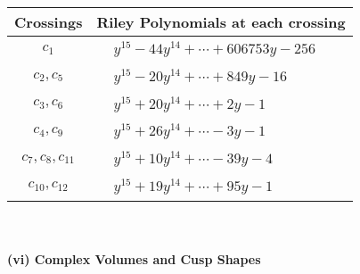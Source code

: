 \documentclass[1p]{elsarticle_modified}
\theoremstyle{definition}
\begin{document}
\begin{tabular}{m{50pt}|m{274pt}}
Crossings & \hspace{64pt}Riley Polynomials at each crossing \\
\hline $$\begin{aligned}c_{1}\end{aligned}$$&$\begin{aligned}
&y^{15}-44 y^{14}+\cdots+606753 y-256
\end{aligned}$\\
\hline $$\begin{aligned}c_{2},c_{5}\end{aligned}$$&$\begin{aligned}
&y^{15}-20 y^{14}+\cdots+849 y-16
\end{aligned}$\\
\hline $$\begin{aligned}c_{3},c_{6}\end{aligned}$$&$\begin{aligned}
&y^{15}+20 y^{14}+\cdots+2 y-1
\end{aligned}$\\
\hline $$\begin{aligned}c_{4},c_{9}\end{aligned}$$&$\begin{aligned}
&y^{15}+26 y^{14}+\cdots-3 y-1
\end{aligned}$\\
\hline $$\begin{aligned}c_{7},c_{8},c_{11}\end{aligned}$$&$\begin{aligned}
&y^{15}+10 y^{14}+\cdots-39 y-4
\end{aligned}$\\
\hline $$\begin{aligned}c_{10},c_{12}\end{aligned}$$&$\begin{aligned}
&y^{15}+19 y^{14}+\cdots+95 y-1
\end{aligned}$\\
\hline
\end{tabular}\\~\\
\newpage\flushleft \textbf{(vi) Complex Volumes and Cusp Shapes}
\end{document}
